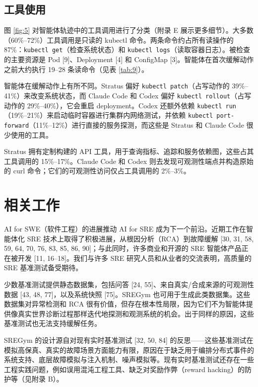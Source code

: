 \documentclass[11pt,UTF8,fontset=fandol]{ctexart}
\begin{document}
\subsection{工具使用}

图 \ref{fig:5} 对智能体轨迹中的工具调用进行了分类（附录 E 展示更多细节）。大多数（60\%--72\%）工具调用是只读的 kubectl 命令。两条命令约占所有读操作的 87\%：\texttt{kubectl get}（检查系统状态）和 \texttt{kubectl logs}（读取容器日志）。被检查的主要资源是 Pod [9]、Deployment [4] 和 ConfigMap [3]。智能体在首次缓解动作之前大约执行 19--28 条读命令（见表 \ref{tab:9}）。

智能体在缓解动作上有所不同。Stratus 偏好 \texttt{kubectl patch}（占写动作的 39\%--41\%）来改变系统状态，而 Claude Code 和 Codex 偏好 \texttt{kubectl rollout}（占写动作的 29\%--40\%），它会重启 deployment。Codex 还额外依赖 \texttt{kubectl run}（19\%--21\%）来启动临时容器进行集群内网络测试，并依赖 \texttt{kubectl port-forward}（11\%--12\%）进行直接的服务探测，而这些是 Stratus 和 Claude Code 很少使用的工具。

Stratus 拥有定制构建的 API 工具，用于查询指标、追踪和服务依赖图，这些占其工具调用的 15\%--17\%。Claude Code 和 Codex 则去发现可观测性端点并构造原始的 curl 命令；它们的可观测性访问仅占工具调用的 2\%--3\%。

\section{相关工作}

AI for SWE（软件工程）的进展推动 AI for SRE 成为下一个前沿。近期工作在智能体化 SRE 技术上取得了积极进展，从根因分析（RCA）到故障缓解 [30, 31, 58, 59, 64, 70, 76, 83, 85, 86, 90]；与此同时，许多商业和开源的 SRE 智能体产品正在被开发 [11, 16--18]。我们与许多 SRE 研究人员和从业者的交流表明，高质量的 SRE 基准测试备受期待。

少数基准测试提供静态数据集，包括问答 [24, 55]、来自真实/合成来源的可观测性数据 [43, 48, 77]，以及系统快照 [75]。SREGym 也可用于生成此类数据集。这些数据集对异常检测和 RCA 很有价值，但存在根本性局限，因为它们不为智能体提供像真实世界诊断过程那样迭代地探测和观测系统的机会。出于同样的原因，这些基准测试也无法支持缓解任务。

SREGym 的设计源自对现有实时基准测试 [32, 50, 84] 的反思——这些基准测试在模拟高保真、真实的故障场景方面能力有限，原因在于缺乏用于编排分布式事件的系统支持、底层故障模拟与注入机制、噪声模拟等。现有实时基准测试还存在一些工程实践问题，例如误用混沌工程工具、缺乏对奖励作弊（reward hacking）的防护等（见附录 B）。
\end{document}
